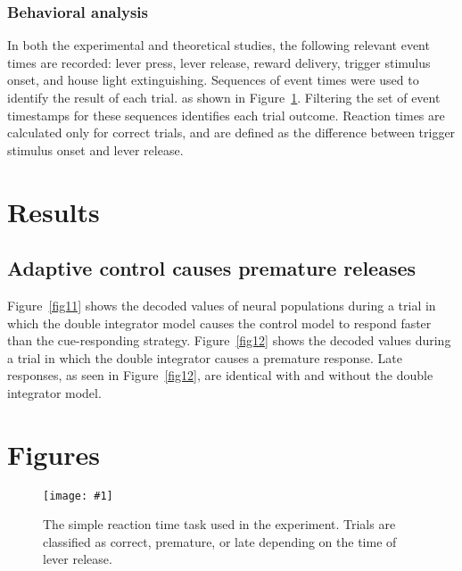 \documentclass[11pt]{article}
\newcommand{\scalefigone}[3]{
  \begin{figure}[ht!]
    \centering
    \texttt{[image: \#1]}
    \caption{#3}
    \label{#1}
  \end{figure}}
\begin{document}
\subsubsection{Behavioral analysis}

In both the experimental and theoretical studies,
the following relevant event times are recorded:
lever press, lever release, reward delivery,
trigger stimulus onset, and house light extinguishing.
Sequences of event times were used to
identify the result of each trial.
as shown in Figure~\ref{fig1}.
Filtering the set of event timestamps
for these sequences identifies each trial outcome.
Reaction times are calculated
only for correct trials,
and are defined as the difference between
trigger stimulus onset and lever release.

\section{Results}

\subsection{Adaptive control causes premature releases}

Figure~\ref{fig11} shows the decoded values
of neural populations during a trial in which
the double integrator model
causes the control model to respond faster than
the cue-responding strategy.
Figure~\ref{fig12} shows the decoded values
during a trial in which
the double integrator causes a premature response.
Late responses, as seen in Figure~\ref{fig12},
are identical with and without the double integrator model.

\clearpage

\section{Figures}

\scalefigone{fig1}{0.5}{
  The simple reaction time task used in the experiment.
  Trials are classified as correct, premature, or late
  depending on the time of lever release.
}
\end{document}

